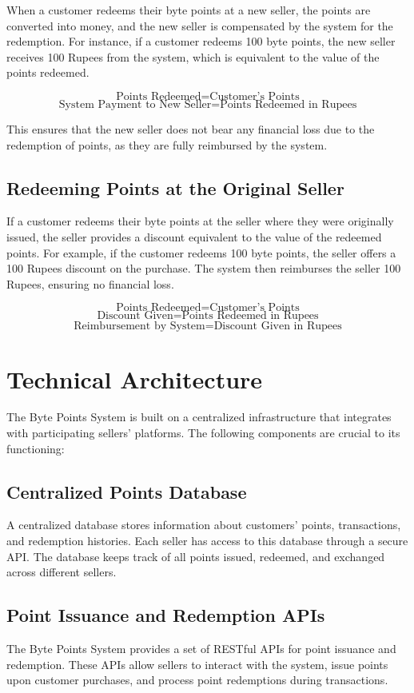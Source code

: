 \documentclass[a4paper,12pt]{article}
\begin{document}
When a customer redeems their byte points at a new seller, the points are converted into money, and the new seller is compensated by the system for the redemption. For instance, if a customer redeems 100 byte points, the new seller receives 100 Rupees from the system, which is equivalent to the value of the points redeemed.

\[
\text{Points Redeemed} = \text{Customer's Points}
\]
\[
\text{System Payment to New Seller} = \text{Points Redeemed in Rupees}
\]

This ensures that the new seller does not bear any financial loss due to the redemption of points, as they are fully reimbursed by the system.

\subsection{Redeeming Points at the Original Seller}

If a customer redeems their byte points at the seller where they were originally issued, the seller provides a discount equivalent to the value of the redeemed points. For example, if the customer redeems 100 byte points, the seller offers a 100 Rupees discount on the purchase. The system then reimburses the seller 100 Rupees, ensuring no financial loss.

\[
\text{Points Redeemed} = \text{Customer's Points}
\]
\[
\text{Discount Given} = \text{Points Redeemed in Rupees}
\]
\[
\text{Reimbursement by System} = \text{Discount Given in Rupees}
\]

\section{Technical Architecture}

The Byte Points System is built on a centralized infrastructure that integrates with participating sellers' platforms. The following components are crucial to its functioning:

\subsection{Centralized Points Database}
A centralized database stores information about customers' points, transactions, and redemption histories. Each seller has access to this database through a secure API. The database keeps track of all points issued, redeemed, and exchanged across different sellers.

\subsection{Point Issuance and Redemption APIs}
The Byte Points System provides a set of RESTful APIs for point issuance and redemption. These APIs allow sellers to interact with the system, issue points upon customer purchases, and process point redemptions during transactions.
\end{document}
